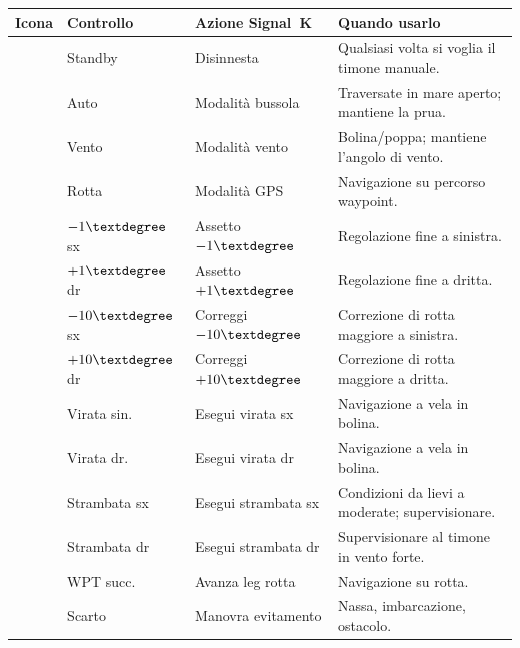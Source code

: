 \begin{longtable}{C{1.4cm}L{2.4cm}L{4.6cm}L{5.3cm}}
\toprule
{}
\color{white}\sffamily\bfseries Icona &
\color{white}\sffamily\bfseries Controllo &
\color{white}\sffamily\bfseries Azione Signal~K &
\color{white}\sffamily\bfseries Quando usarlo \\
\midrule
{}                & Standby      & Disinnesta           & Qualsiasi volta si voglia il timone manuale. \\
           & Auto         & Modalità bussola     & Traversate in mare aperto; mantiene la prua. \\
                      & Vento        & Modalità vento       & Bolina/poppa; mantiene l'angolo di vento. \\
            & Rotta        & Modalità GPS         & Navigazione su percorso waypoint. \\
               & $-1\textdegree$ sx & Assetto $-1\textdegree$ & Regolazione fine a sinistra. \\
                & $+1\textdegree$ dr & Assetto $+1\textdegree$ & Regolazione fine a dritta. \\
  & $-10\textdegree$ sx & Correggi $-10\textdegree$ & Correzione di rotta maggiore a sinistra. \\
 & $+10\textdegree$ dr & Correggi $+10\textdegree$ & Correzione di rotta maggiore a dritta. \\
           & Virata sin.  & Esegui virata sx     & Navigazione a vela in bolina. \\
          & Virata dr.   & Esegui virata dr     & Navigazione a vela in bolina. \\
  & Strambata sx & Esegui strambata sx  & Condizioni da lievi a moderate; supervisionare. \\
 & Strambata dr & Esegui strambata dr  & Supervisionare al timone in vento forte. \\
       & WPT succ.    & Avanza leg rotta     & Navigazione su rotta. \\
                      & Scarto       & Manovra evitamento   & Nassa, imbarcazione, ostacolo. \\
\bottomrule
\end{longtable}

